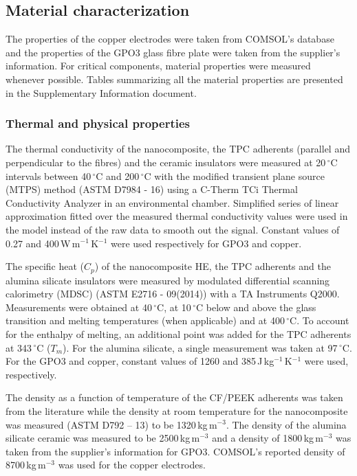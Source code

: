 \subsection{Material characterization}

The properties of the copper electrodes were taken from COMSOL’s database and the properties of the GPO3 glass fibre plate were taken from the supplier’s information. 
For critical components, material properties were measured whenever possible. 
Tables summarizing all the material properties are presented in the Supplementary Information document. 

\subsubsection{Thermal and physical properties}

The thermal conductivity of the nanocomposite, the TPC adherents (parallel and perpendicular to the fibres) and the ceramic insulators were measured at 20\,$^{\circ}$C intervals between 40\,$^{\circ}$C and 200\,$^{\circ}$C with the modified transient plane source (MTPS) method (ASTM D7984 - 16) using a C-Therm TCi Thermal Conductivity Analyzer in an environmental chamber. 
Simplified series of linear approximation fitted over the measured thermal conductivity values were used in the model instead of the raw data to smooth out the signal. 
Constant values of 0.27 and \mbox{400\,W\,m$^{-1}$\,K$^{-1}$} were used respectively for GPO3 and copper. 

The specific heat ($C_p$) of the nanocomposite HE, the TPC adherents and the alumina silicate insulators were measured by modulated differential scanning calorimetry (MDSC) (ASTM E2716 - 09(2014)) with a TA Instruments Q2000. 
Measurements were obtained at 40\,$^{\circ}$C, at 10\,$^{\circ}$C below and above the glass transition and melting temperatures (when applicable) and at 400\,$^{\circ}$C. 
To account for the enthalpy of melting, an additional point was added for the TPC adherents at 343\,$^{\circ}$C ($T_m$). 
For the alumina silicate, a single measurement was taken at 97\,$^{\circ}$C. 
For the GPO3 and copper, constant values of 1260 and \mbox{385\,J\,kg$^{-1}$\,K$^{-1}$} were used, respectively. 

The density as a function of temperature of the CF/PEEK adherents was taken from the literature \cite{Talbot2013} while the density at room temperature for the nanocomposite was measured (ASTM D792 – 13) to be \mbox{1320\,kg\,m$^{-3}$}. 
The density of the alumina silicate ceramic was measured to be \mbox{2500\,kg\,m$^{-3}$} and a density of \mbox{1800\,kg\,m$^{-3}$} was taken from the supplier’s information for GPO3. 
COMSOL’s reported density of \mbox{8700\,kg\,m$^{-3}$} was used for the copper electrodes. 

